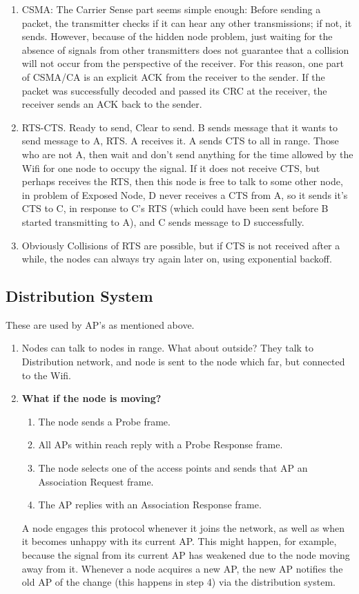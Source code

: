 \documentclass[12pt]{book}
\begin{document}
\begin{enumerate}
    \item CSMA: The Carrier Sense part seems simple enough: Before sending a packet, the transmitter checks if it can hear any other transmissions; if not, it sends. However, because of the hidden node problem, just waiting for the absence of signals from other transmitters does not guarantee that a collision will not occur from the perspective of the receiver. For this reason, one part of CSMA/CA is an explicit ACK from the receiver to the sender. If the packet was successfully decoded and passed its CRC at the receiver, the receiver sends an ACK back to the sender.
    \item RTS-CTS. Ready to send, Clear to send. B sends message that it wants to send message to A, RTS. A receives it. A sends CTS to all in range. Those who are not A, then wait and don't send anything for the time allowed by the Wifi for one node to occupy the signal. If it does not receive CTS, but perhaps receives the RTS, then this node is free to talk to some other node, in problem of Exposed Node, D never receives a CTS from A, so it sends it's CTS to C, in response to C's RTS (which could have been sent before B started transmitting to A), and C sends message to D successfully.
    \item Obviously Collisions of RTS are possible, but if CTS is not received after a while, the nodes can always try again later on, using exponential backoff.
\end{enumerate}

\subsection{Distribution System}
These are used by AP's as mentioned above.
\begin{enumerate}
    \item Nodes can talk to nodes in range. What about outside? They talk to Distribution network, and node is sent to the node which far, but connected to the Wifi.
    \item \textbf{What if the node is moving?}
    \begin{enumerate}
        \item The node sends a Probe frame.
        \item All APs within reach reply with a Probe Response frame.
        \item The node selects one of the access points and sends that AP an Association Request frame.
        \item The AP replies with an Association Response frame.
    \end{enumerate}
    A node engages this protocol whenever it joins the network, as well as when it becomes unhappy with its current AP. This might happen, for example, because the signal from its current AP has weakened due to the node moving away from it. Whenever a node acquires a new AP, the new AP notifies the old AP of the change (this happens in step 4) via the distribution system.
\end{enumerate}
\end{document}
